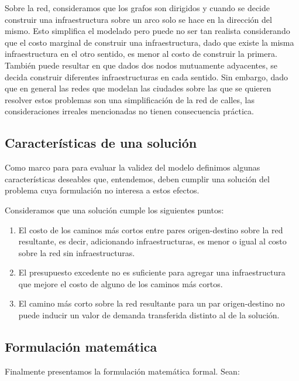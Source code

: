\documentclass{article}
\begin{document}
  Sobre la red, consideramos que los grafos son dirigidos y cuando se decide construir una infraestructura sobre un arco solo se hace en la dirección del mismo. Esto simplifica el modelado pero puede no ser tan realista considerando que el costo marginal de construir una infraestructura, dado que existe la misma infraestructura en el otro sentido, es menor al costo de construir la primera. También puede resultar en que dados dos nodos mutuamente adyacentes, se decida construir diferentes infraestructuras en cada sentido. Sin embargo, dado que en general las redes que modelan las ciudades sobre las que se quieren resolver estos problemas son una simplificación de la red de calles, las consideraciones irreales mencionadas no tienen consecuencia práctica.

  \subsection{Características de una solución}
  \label{sect:solutioncharacteristics}

  Como marco para para evaluar la validez del modelo definimos algunas características deseables que, entendemos, deben cumplir una solución del problema cuya formulación no interesa a estos efectos.

  Consideramos que una solución cumple los siguientes puntos:

  \begin{enumerate}
      \item{El costo de los caminos más cortos entre pares origen-destino sobre la red resultante, es decir, adicionando infraestructuras, es menor o igual al costo sobre la red sin infraestructuras.}
    \item{\label{budgetexcess} El presupuesto excedente no es suficiente para agregar una infraestructura que mejore el costo de alguno de los caminos más cortos.}
    \item{El camino más corto sobre la red resultante para un par origen-destino no puede inducir un valor de demanda transferida distinto al de la solución.}
  \end{enumerate}

  \subsection{Formulación matemática}

  Finalmente presentamos la formulación matemática formal. Sean:
\end{document}
